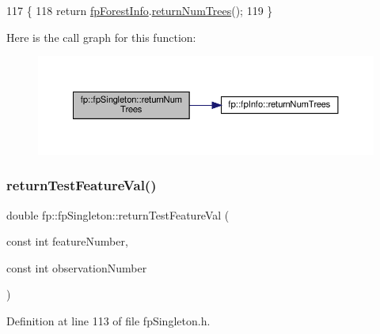 \begin{DoxyCode}
117                                        \{
118                 \textcolor{keywordflow}{return} \hyperlink{classfp_1_1fpSingleton_a85965009befa72a749ae498fa5b6ccfa}{fpForestInfo}.\hyperlink{classfp_1_1fpInfo_a7711d632e8718a60070594e9c731599a}{returnNumTrees}();
119             \}
\end{DoxyCode}
Here is the call graph for this function\+:
\nopagebreak
\begin{figure}[H]
\begin{center}
\leavevmode
\includegraphics[width=350pt]{classfp_1_1fpSingleton_a8be36616345b6b77ce4c60b99cc2b91c_cgraph}
\end{center}
\end{figure}
\mbox{\label{classfp_1_1fpSingleton_ad74b421d65b17ba924244bff31fc9db6}} 
\subsubsection{\texorpdfstring{return\+Test\+Feature\+Val()}{returnTestFeatureVal()}}
{\footnotesize\ttfamily double fp\+::fp\+Singleton\+::return\+Test\+Feature\+Val (\begin{DoxyParamCaption}\item[{const int}]{feature\+Number,  }\item[{const int}]{observation\+Number }\end{DoxyParamCaption})\hspace{0.3cm}{\ttfamily [inline]}}



Definition at line 113 of file fp\+Singleton.\+h.


